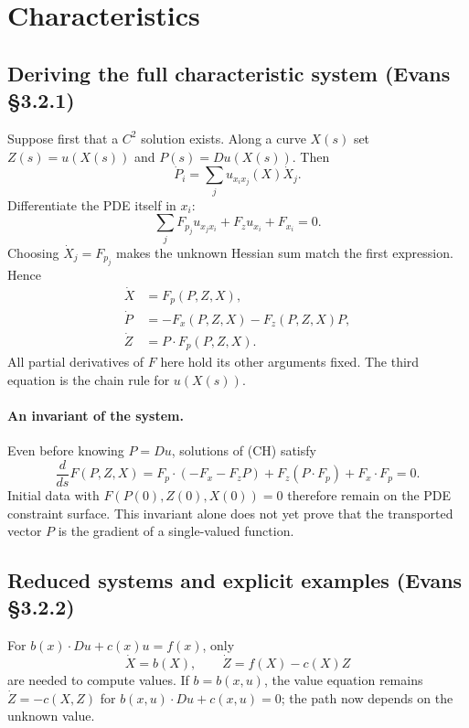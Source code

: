 \Needspace{65mm}
\section{Characteristics}
\label{sec:3-2}

\subsection{Deriving the full characteristic system (Evans \S3.2.1)}
Suppose first that a $C^2$ solution exists. Along a curve $X(s)$ set
$Z(s)=u(X(s))$ and $P(s)=Du(X(s))$.
Then
\[
 \dot P_i=\sum_j u_{x_ix_j}(X)\dot X_j.
\]
Differentiate the PDE itself in $x_i$:
\[
 \sum_j F_{p_j}u_{x_jx_i}+F_z u_{x_i}+F_{x_i}=0.
\]
Choosing $\dot X_j=F_{p_j}$ makes the unknown Hessian sum match
the first expression. Hence
\[
 \boxed{\begin{aligned}
 \dot X&=F_p(P,Z,X),\\
 \dot P&=-F_x(P,Z,X)-F_z(P,Z,X)P,\\
 \dot Z&=P\cdot F_p(P,Z,X).
 \end{aligned}}
 \tag{CH}
\]
All partial derivatives of $F$ here hold its other arguments fixed.
The third equation is the chain rule for $u(X(s))$.
\Needspace{45mm}

\paragraph{An invariant of the system.}
Even before knowing $P=Du$, solutions of (CH) satisfy
\[
 \frac d{ds}F(P,Z,X)
 =F_p\cdot(-F_x-F_zP)+F_z(P\cdot F_p)+F_x\cdot F_p=0.
\]
Initial data with $F(P(0),Z(0),X(0))=0$ therefore remain on the
PDE constraint surface. This invariant alone does not yet prove
that the transported vector $P$ is the gradient of a single-valued function.

\subsection{Reduced systems and explicit examples (Evans \S3.2.2)}
For $b(x)\cdot Du+c(x)u=f(x)$, only
\[
 \dot X=b(X),\qquad \dot Z=f(X)-c(X)Z
\]
are needed to compute values.
If $b=b(x,u)$, the value equation remains
$\dot Z=-c(X,Z)$ for $b(x,u)\cdot Du+c(x,u)=0$;
the path now depends on the unknown value.

